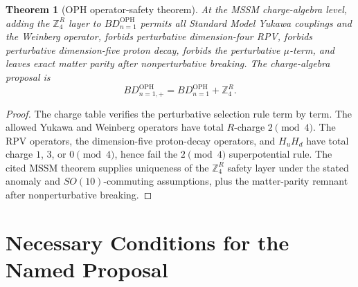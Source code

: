 \documentclass[11pt]{article}
\newtheorem{theorem}{Theorem}[section]
\theoremstyle{remark}
\theoremstyle{plain}
\newcommand{\OPH}{\mathrm{OPH}}
\newcommand{\ZfourR}{\mathbb Z_4^R}
\begin{document}
\begin{theorem}[OPH operator-safety theorem]
At the MSSM charge-algebra level, adding the \(\ZfourR\) layer to \(BD_{n=1}^{\OPH}\) permits
all Standard Model Yukawa couplings and the Weinberg operator, forbids perturbative
dimension-four RPV, forbids perturbative dimension-five proton decay, forbids the perturbative
\(\mu\)-term, and leaves exact matter parity after nonperturbative breaking. The charge-algebra
proposal is
\[
BD_{n=1,+}^{\OPH}=BD_{n=1}^{\OPH}+\ZfourR.
\]
\end{theorem}

\begin{proof}
The charge table verifies the perturbative selection rule term by term. The allowed Yukawa and
Weinberg operators have total \(R\)-charge \(2\pmod4\). The RPV operators, the dimension-five
proton-decay operators, and \(H_uH_d\) have total charge \(1\), \(3\), or \(0\pmod4\), hence fail
the \(2\pmod4\) superpotential rule. The cited MSSM theorem supplies uniqueness of the
\(\ZfourR\) safety layer under the stated anomaly and \(SO(10)\)-commuting assumptions, plus the
matter-parity remnant after nonperturbative breaking.
\end{proof}

\section{Necessary Conditions for the Named Proposal}
\end{document}
